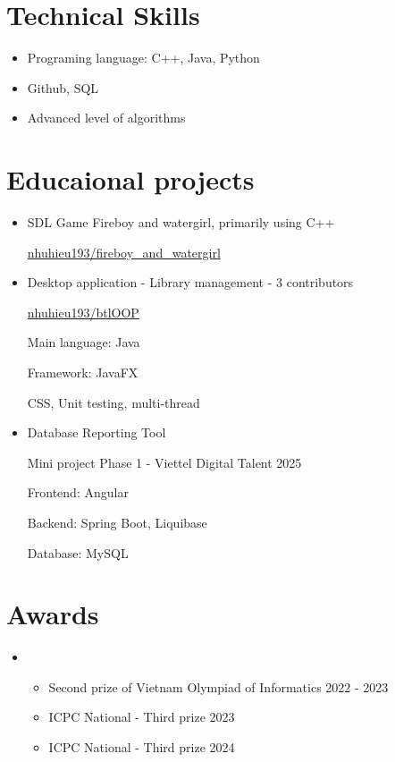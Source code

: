 \documentclass[letterpaper,11pt]{article}
\newcommand{\cvitem}[1]{
  \item\small{
    {#1\vspace{-2pt}}
  }
}
\newcommand{\cvheadingstart}{\begin{itemize}[leftmargin=0in, label={}]}
\newcommand{\cvheadingend}{\end{itemize}}
\newcommand{\cvitemstart}{\begin{itemize}\justifying}
\newcommand{\cvitemend}{\end{itemize}\vspace{-5pt}}
\begin{document}
\section{Technical Skills}
    \cvitemstart
        \cvitem {Programing language: C++, Java, Python}
        \cvitem {Github, SQL}
        \cvitem {Advanced level of algorithms}
    \cvitemend

\section{Educaional projects}
\cvitemstart
    \cvitem {SDL Game Fireboy and watergirl, primarily using C++\hfill}
    \href{https://github.com/nhuhieu193/fireboy_and_watergirl}{nhuhieu193/fireboy\_and\_watergirl}
    \cvitem {Desktop application - Library management - 3 contributors\hfill}
    \href{https://github.com/nhuhieu193/btlOOP}{nhuhieu193/btlOOP}

    Main language: Java
    
    Framework: JavaFX

    CSS, Unit testing, multi-thread

    \cvitem {Database Reporting Tool\hfill}
    
    Mini project Phase 1 - Viettel Digital Talent 2025

    Frontend: Angular

    Backend: Spring Boot, Liquibase

    Database: MySQL
    
\cvitemend

\section{Awards}
\cvheadingstart
\item
\cvitemstart
  \cvitem{Second prize of Vietnam Olympiad of Informatics\hfill}{2022 - 2023}
  \cvitem{ICPC National - Third prize \hfill}{2023}
  \cvitem{ICPC National - Third prize \hfill}{2024}
\cvitemend
\cvheadingend
\end{document}
